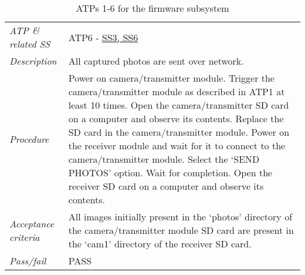 \documentclass[class=report,11pt,crop=false]{standalone}
\begin{document}
\begin{table}[!ht]
\begin{scriptsize}
\begin{tabularx}{\textwidth}{|p{} X|}
        \textit{ATP \& related SS} & ATP6 - \hyperlink{tab:firmware-requirements}{SS3, SS6}\\
        \textit{Description} & All captured photos are sent over network. \\
        \textit{Procedure} & Power on camera/transmitter module. Trigger the camera/transmitter module as described in ATP1 at least 10 times. Open the camera/transmitter SD card on a computer and observe its contents. Replace the SD card in the camera/transmitter module. Power on the receiver module and wait for it to connect to the camera/transmitter module. Select the `SEND PHOTOS' option. Wait for completion. Open the receiver SD card on a computer and observe its contents.\\
        \textit{Acceptance criteria} & All images initially present in the `photos' directory of the camera/transmitter module SD card are present in the `cam1' directory of the receiver SD card.\\ 
        \textit{Pass/fail} & PASS \\ \hline


        

    \end{tabularx}
    \end{scriptsize}
    \caption{ATPs 1-6 for the firmware subsystem}
    \label{tab:firmware-atps1}
\end{table}
\end{document}
